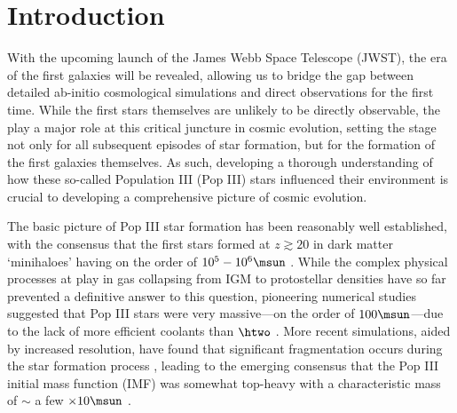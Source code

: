 \section{Introduction}
\label{intro}

With the upcoming launch of the James Webb Space Telescope (JWST), the era of the first galaxies will be revealed, allowing us to bridge the gap between detailed ab-initio cosmological simulations and direct observations for the first time. While the first stars themselves are unlikely to be directly observable, the play a major role at this critical juncture in cosmic evolution, setting the stage not only for all subsequent episodes of star formation, but for the formation of the first galaxies themselves.  As such, developing a thorough understanding of how these so-called Population III (Pop III) stars influenced their environment is crucial to developing a comprehensive picture of cosmic evolution.

The basic picture of Pop III star formation has been reasonably well established, with the consensus that the first stars formed at $z\gtrsim20$ in dark matter `minihaloes' having on the order of $10^5 - 10^6\msun$ \citep{CouchmanRees1986, HaimanThoulLoeb1996, Tegmarketal1997}. While the complex physical processes at play in gas collapsing from IGM to protostellar densities have so far prevented a definitive answer to this question, pioneering numerical studies suggested that Pop III stars were very massive---on the order of $100\msun$---due to the lack of more efficient coolants than $\htwo$ \citep[e.g.,][]{BrommCoppiLarson1999, BrommCoppiLarson2002, AbelBryanNorman2002, Yoshidaetal2003, BrommLarson2004, Yoshidaetal2006, O'SheaNorman2007}. More recent simulations, aided by increased resolution, have found that significant fragmentation occurs during the star formation process \citep{StacyGreifBromm2010, Clarketal2011a, Clarketal2011b, Greifetal2011, Greifetal2012, StacyBromm2013, Hiranoetal2014}, leading to the emerging consensus that the Pop III initial mass function (IMF) was somewhat top-heavy with a characteristic mass of $\sim$ a few $\times 10\msun$ \citep{Bromm2013}.

